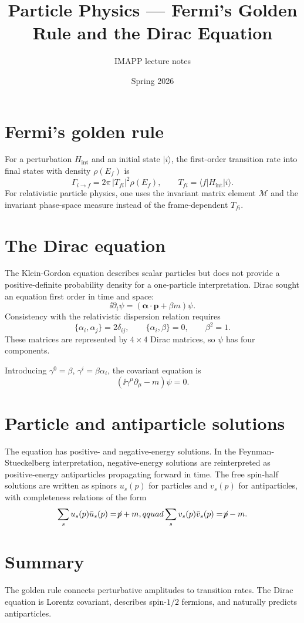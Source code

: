 \documentclass[11pt,a4paper]{article}
\title{Particle Physics --- Fermi's Golden Rule and the Dirac Equation}
\author{IMAPP lecture notes}
\date{Spring 2026}
\begin{document}
\maketitle

\section{Fermi's golden rule}
For a perturbation $H_{\mathrm{int}}$ and an initial state $|i\rangle$, the first-order transition rate into final states with density $\rho(E_f)$ is
\[
\Gamma_{i\to f}=2\pi\,|T_{fi}|^2\rho(E_f),\qquad T_{fi}=\langle f|H_{\mathrm{int}}|i\rangle.
\]
For relativistic particle physics, one uses the invariant matrix element $\mathcal M$ and the invariant phase-space measure instead of the frame-dependent $T_{fi}$.

\section{The Dirac equation}
The Klein-Gordon equation describes scalar particles but does not provide a positive-definite probability density for a one-particle interpretation. Dirac sought an equation first order in time and space:
\[
\ii\partial_t\psi=\left(\boldsymbol\alpha\cdot\mathbf p+\beta m\right)\psi.
\]
Consistency with the relativistic dispersion relation requires
\[
\{\alpha_i,\alpha_j\}=2\delta_{ij},\qquad
\{\alpha_i,\beta\}=0,\qquad \beta^2=1.
\]
These matrices are represented by $4\times4$ Dirac matrices, so $\psi$ has four components.

Introducing $\gamma^0=\beta$, $\gamma^i=\beta\alpha_i$, the covariant equation is
\[
(\ii\gamma^\mu\partial_\mu-m)\psi=0.
\]

\section{Particle and antiparticle solutions}
The equation has positive- and negative-energy solutions. In the Feynman-Stueckelberg interpretation, negative-energy solutions are reinterpreted as positive-energy antiparticles propagating forward in time. The free spin-half solutions are written as spinors $u_s(p)$ for particles and $v_s(p)$ for antiparticles, with completeness relations of the form
\[
\sum_s u_s(p)\bar u_s(p)=\slashed p+m,qquad
\sum_s v_s(p)\bar v_s(p)=\slashed p-m.
\]

\section*{Summary}
The golden rule connects perturbative amplitudes to transition rates. The Dirac equation is Lorentz covariant, describes spin-$1/2$ fermions, and naturally predicts antiparticles.
\end{document}
